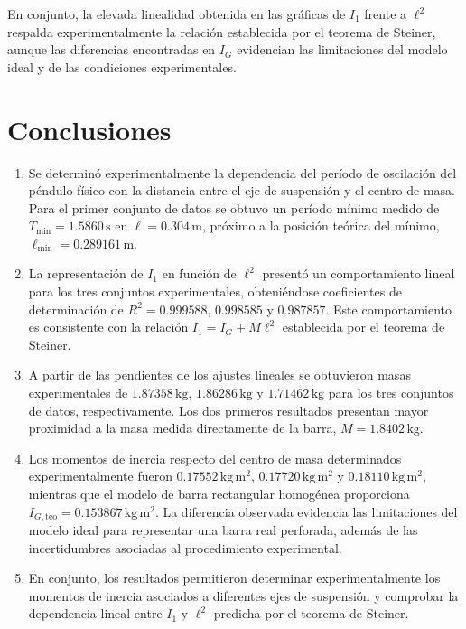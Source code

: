 \documentclass[11pt,a4paper]{article}
\begin{document}
En conjunto, la elevada linealidad obtenida en las gráficas de $I_1$ frente a $\ell^2$ respalda experimentalmente la relación establecida por el teorema de Steiner, aunque las diferencias encontradas en $I_G$ evidencian las limitaciones del modelo ideal y de las condiciones experimentales.

\newpage
\section{Conclusiones}

\begin{enumerate}

    \item Se determinó experimentalmente la dependencia del período de oscilación del péndulo físico con la distancia entre el eje de suspensión y el centro de masa. Para el primer conjunto de datos se obtuvo un período mínimo medido de
    $T_{\min}=1.5860\,\mathrm{s}$ en $\ell=0.304\,\mathrm{m}$, próximo a la posición teórica del mínimo,
    $\ell_{\min}=0.289161\,\mathrm{m}$.

    \item La representación de $I_1$ en función de $\ell^2$ presentó un comportamiento lineal para los tres conjuntos experimentales, obteniéndose coeficientes de determinación de
    $R^2=0.999588$, $0.998585$ y $0.987857$. Este comportamiento es consistente con la relación
    $I_1=I_G+M\ell^2$ establecida por el teorema de Steiner.

    \item A partir de las pendientes de los ajustes lineales se obtuvieron masas experimentales de
    $1.87358\,\mathrm{kg}$,
    $1.86286\,\mathrm{kg}$ y
    $1.71462\,\mathrm{kg}$ para los tres conjuntos de datos, respectivamente. Los dos primeros resultados presentan mayor proximidad a la masa medida directamente de la barra,
    $M=1.8402\,\mathrm{kg}$.

    \item Los momentos de inercia respecto del centro de masa determinados experimentalmente fueron
    $0.17552\,\mathrm{kg\,m^2}$,
    $0.17720\,\mathrm{kg\,m^2}$ y
    $0.18110\,\mathrm{kg\,m^2}$, mientras que el modelo de barra rectangular homogénea proporciona
    $I_{G,\mathrm{teo}}=0.153867\,\mathrm{kg\,m^2}$. La diferencia observada evidencia las limitaciones del modelo ideal para representar una barra real perforada, además de las incertidumbres asociadas al procedimiento experimental.

    \item En conjunto, los resultados permitieron determinar experimentalmente los momentos de inercia asociados a diferentes ejes de suspensión y comprobar la dependencia lineal entre $I_1$ y $\ell^2$ predicha por el teorema de Steiner.

\end{enumerate}
\end{document}
